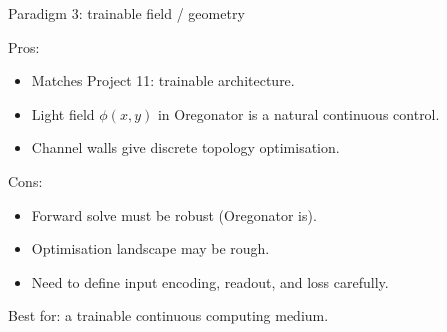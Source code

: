 \documentclass[aspectratio=169,11pt]{beamer}
\begin{document}
\begin{frame}{Paradigm 3: trainable field / geometry}

Pros:
\begin{itemize}
    \item Matches Project 11: trainable architecture.
    \item Light field $\phi(x,y)$ in Oregonator is a natural continuous control.
    \item Channel walls give discrete topology optimisation.
\end{itemize}

Cons:
\begin{itemize}
    \item Forward solve must be robust (Oregonator is).
    \item Optimisation landscape may be rough.
    \item Need to define input encoding, readout, and loss carefully.
\end{itemize}

\vspace{0.3cm}
\centering
Best for: a trainable continuous computing medium.

\end{frame}
\end{document}
